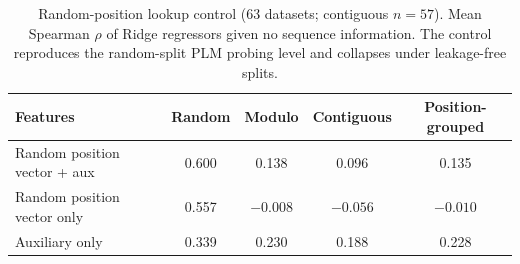 \documentclass[11pt,a4paper]{article}
\newcommand{\revised}[1]{#1}
\begin{document}
\begin{table}[ht]
\centering
\caption{\revised{Random-position lookup control (63 datasets; contiguous $n = 57$).
Mean Spearman $\rho$ of Ridge regressors given no sequence information. The control
reproduces the random-split PLM probing level and collapses under leakage-free
splits.}}
\label{tab:control}
\begin{tabular}{lcccc}
\toprule
Features & Random & Modulo & Contiguous & Position-grouped \\
\midrule
Random position vector + aux & 0.600 & 0.138 & 0.096 & 0.135 \\
Random position vector only  & 0.557 & $-0.008$ & $-0.056$ & $-0.010$ \\
Auxiliary only               & 0.339 & 0.230 & 0.188 & 0.228 \\
\bottomrule
\end{tabular}
\end{table}
\end{document}
